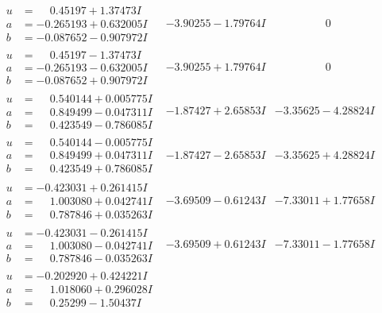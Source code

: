 \documentclass[1p]{elsarticle_modified}
\theoremstyle{definition}
\begin{document}
$$\begin{array}{c|c|c}
\begin{aligned}
u &= \phantom{-}0.45197 + 1.37473 I \\
a &= -0.265193 + 0.632005 I \\
b &= -0.087652 - 0.907972 I\end{aligned}
 & -3.90255 - 1.79764 I & \phantom{-0.000000 } 0 \\ \hline\begin{aligned}
u &= \phantom{-}0.45197 - 1.37473 I \\
a &= -0.265193 - 0.632005 I \\
b &= -0.087652 + 0.907972 I\end{aligned}
 & -3.90255 + 1.79764 I & \phantom{-0.000000 } 0 \\ \hline\begin{aligned}
u &= \phantom{-}0.540144 + 0.005775 I \\
a &= \phantom{-}0.849499 - 0.047311 I \\
b &= \phantom{-}0.423549 - 0.786085 I\end{aligned}
 & -1.87427 + 2.65853 I & -3.35625 - 4.28824 I \\ \hline\begin{aligned}
u &= \phantom{-}0.540144 - 0.005775 I \\
a &= \phantom{-}0.849499 + 0.047311 I \\
b &= \phantom{-}0.423549 + 0.786085 I\end{aligned}
 & -1.87427 - 2.65853 I & -3.35625 + 4.28824 I \\ \hline\begin{aligned}
u &= -0.423031 + 0.261415 I \\
a &= \phantom{-}1.003080 + 0.042741 I \\
b &= \phantom{-}0.787846 + 0.035263 I\end{aligned}
 & -3.69509 - 0.61243 I & -7.33011 + 1.77658 I \\ \hline\begin{aligned}
u &= -0.423031 - 0.261415 I \\
a &= \phantom{-}1.003080 - 0.042741 I \\
b &= \phantom{-}0.787846 - 0.035263 I\end{aligned}
 & -3.69509 + 0.61243 I & -7.33011 - 1.77658 I \\ \hline\begin{aligned}
u &= -0.202920 + 0.424221 I \\
a &= \phantom{-}1.018060 + 0.296028 I \\
b &= \phantom{-}0.25299 - 1.50437 I\end{aligned}

\end{array}$$
\end{document}
